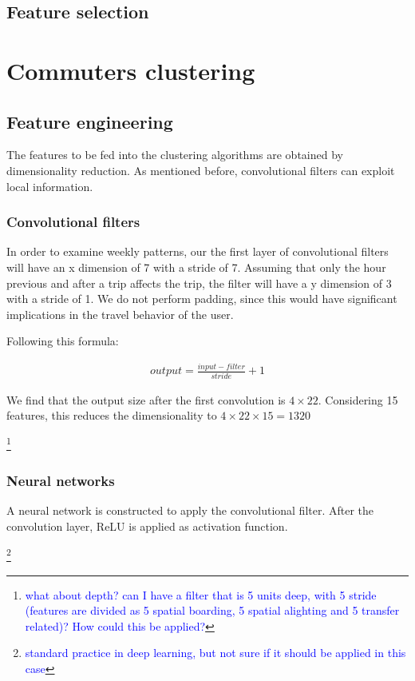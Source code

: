 \documentclass{article}
\newcommand{\technicalDoubt}[1]{\footnote{\textcolor{blue}{#1}}}
\begin{document}
\subsection{Feature selection}


\newpage
\section{Commuters clustering}
\label{sec:partIII}
\subsection{Feature engineering}
The features to be fed into the clustering algorithms are obtained by dimensionality reduction. As mentioned before, convolutional filters can exploit local information.

\subsubsection{Convolutional filters}
In order to examine weekly patterns, our the first layer of convolutional filters will have an x dimension of 7 with a stride of 7. Assuming that only the hour previous and after a trip affects the trip, the filter will have a y dimension of 3 with a stride of 1. We do not perform padding, since this would have significant implications in the travel behavior of the user. 

Following this formula:

\begin{align*}
	output = \frac{input - filter}{stride} +1
\end{align*}

We find that the output size after the first convolution is $4 \times 22$. Considering 15 features, this reduces the dimensionality to $4 \times 22 \times 15 = 1320$

\technicalDoubt{what about depth? can I have a filter that is 5 units deep, with 5 stride (features are divided as 5 spatial boarding, 5 spatial alighting and 5 transfer related)? How could this be applied?}

\subsubsection{Neural networks}
A neural network is constructed to apply the convolutional filter. After the convolution layer, ReLU is applied as activation function. 

\technicalDoubt{standard practice in deep learning, but not sure if it should be applied in this case}
\end{document}
